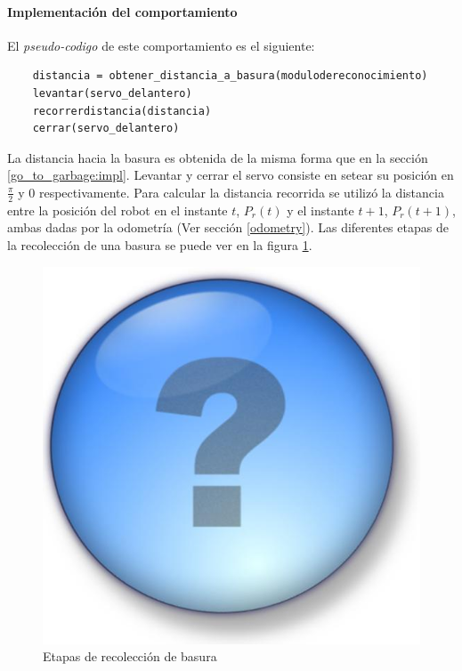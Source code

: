 \paragraph{Implementaci\'on del comportamiento}
El \emph{pseudo-codigo} de este comportamiento es el siguiente:

\begin{verbatim}
    distancia = obtener_distancia_a_basura(modulodereconocimiento)
    levantar(servo_delantero)
    recorrerdistancia(distancia)
    cerrar(servo_delantero)
\end{verbatim}

La distancia hacia la basura es obtenida de la misma forma que en la secci\'on
\ref{go_to_garbage:impl}. Levantar y cerrar el servo consiste en setear su
posici\'on en $\frac{\pi}{2}$ y $0$ respectivamente. Para calcular la distancia
recorrida se utiliz\'o la distancia entre la posici\'on del robot en el instante $t$,
$P_r(t)$ y el instante $t+1$, $P_r(t+1)$, ambas dadas por la odometr\'ia
(Ver secci\'on \ref{odometry}). Las diferentes etapas de la recolecci\'on de una
basura se puede ver en la figura \ref{fig:recollection}.

\begin{figure}[htp]
\begin{center}
\includegraphics[scale=0.3]{comportamientos/unk.jpg}
\caption{Etapas de recolecci\'on de basura}
\label{fig:recollection}
\end{center}
\end{figure}


